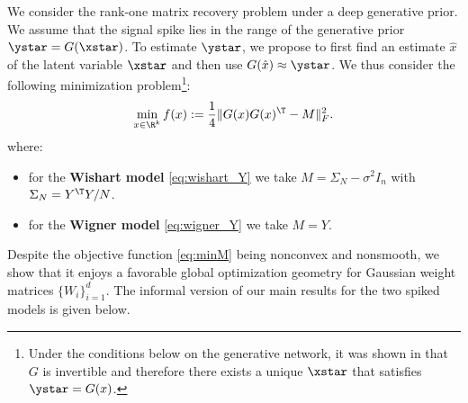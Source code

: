We consider the rank-one matrix recovery problem under a deep generative prior.  We assume that the signal spike lies in the range of the generative prior $\ystar = G(\xstar)$.  To estimate $\ystar$, we propose to 
first find an estimate $\hat{x}$ of the latent variable $\xstar$ and then use $G(\hat{x}) \approx \ystar$.
We thus consider the following  minimization problem\footnote{Under the  conditions below on the generative network, it was shown in \citep{HV17} that $G$ is invertible and therefore there exists a unique $\xstar$ that satisfies $\ystar = G(x)$.}:
\begin{equation}\label{eq:minM}
\min_{x \in \R^k} f(x) := \frac{1}{4} \| G(x)G(x)^\T - {M}\|_F^2.
\end{equation}
where:
\begin{itemize}
	\item for the \textbf{Wishart model} \eqref{eq:wishart_Y} we take $M =  \Sigma_N - \sigma^2 I_n$ with $\Sigma_N = Y^\T Y/N$.
	
	\item for the \textbf{Wigner model} \eqref{eq:wigner_Y} we take $M = Y$.
\end{itemize}
Despite the objective function \eqref{eq:minM} being nonconvex and nonsmooth, we show that it enjoys a favorable global optimization geometry for Gaussian weight matrices $\{W_i\}_{i=1}^d$. 
The informal version of our main results for the two spiked models is given below.
